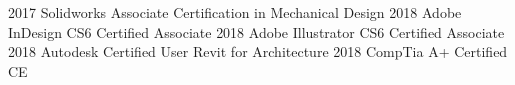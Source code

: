 \begin{cvskills}
  \cvskill
    {2017}
    {Solidworks Associate Certification in Mechanical Design}
  \cvskill
    {2018}
    {Adobe InDesign CS6 Certified Associate}
  \cvskill
    {2018}
    {Adobe Illustrator CS6 Certified Associate}
  \cvskill
    {2018}
    {Autodesk Certified User Revit for Architecture}
  \cvskill
    {2018}
    {CompTia A+ Certified CE}
\end{cvskills}

